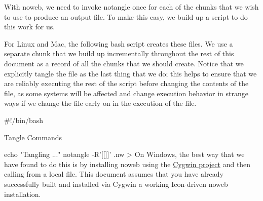 \documentclass{article}%
\begin{document}
With noweb, we need to invoke {\Tt{}notangle\nwendquote} once for each of the 
chunks that we wish to use to produce an output file.
To make this easy, we build up a script to do this work for us.

For Linux and Mac, the following bash script creates these files. 
We use a separate chunk that we build up incrementally 
throughout the rest of this document as a record of all the chunks
that we should create.
Notice that we explicitly tangle the {\Tt{}\nwendquote} file as the last
thing that we do;
this helps to ensure that we are reliably executing the rest of the 
script before changing the contents of the file,
as some systems will be affected and change execution behavior 
in strange ways if we change the {\Tt{}\nwendquote} file early on in the 
execution of the file.

\nwenddocs{}\endmoddef\nwstartdeflinemarkup\nwenddeflinemarkup
#!/bin/bash

\LA{}Tangle Commands~{\nwtagstyle{}}\RA{}

echo "Tangling ..."
notangle -R'[[]]' .nw > 
\eatline
\nwnotused{[[TANGLE.sh]]}\nwendcode{}\nwdocspar
On Windows, the best way that we have found to do this is
by installing noweb using the
\href{https://www.cygwin.com/}{Cygwin project}
and then calling {\Tt{}\nwendquote} from a local {\Tt{}\nwendquote} file.
This document assumes that you have already successfully built and
installed via Cygwin a working Icon-driven noweb installation.
\end{document}
